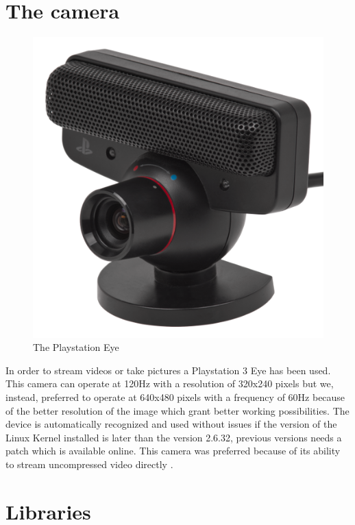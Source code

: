 \section{The camera}
\begin{figure}[hbt]
    \vspace{1cm}
    \centering
    \caption{The Playstation Eye}
    \includegraphics{img/pseye.png}
    \vspace{1cm}
\end{figure}

In order to stream videos or take pictures a Playstation 3 Eye has been used.
This camera can operate at 120Hz with a resolution of 320x240 pixels but we, instead, preferred to operate at 640x480 pixels with a frequency of 60Hz because of the better resolution of the image which grant better working possibilities. The device is automatically recognized and used without issues if the version of the Linux Kernel installed is later than the version 2.6.32, previous versions needs a patch which is available online.
This camera was preferred because of its ability to stream uncompressed video directly \cite{pseyecompr}.
 

\section{Libraries}

